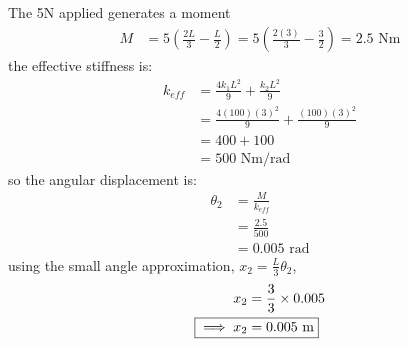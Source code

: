 \subsection{}
The 5N applied generates a moment 
\begin {align*}
    M &= 5 \left(\frac{2L}{3} - \frac{L}{2}\right)  = 5 \left(\frac{2 (3)}{3} - \frac{3}{2}\right) = 2.5 \text{ Nm}
\end{align*}
the effective stiffness is:
\begin{align*}
    k_{eff} &= \frac{4 k_1 L^2}{9} + \frac{k_2 L^2}{9} \\
    &= \frac{4 (100) (3)^2}{9} + \frac{(100) (3)^2}{9} \\
    &= 400 + 100 \\
    &= 500 \text{ Nm/rad}
\end{align*}
so the angular displacement is:
\begin{align*}
    \theta_2 &= \frac{M}{k_{eff}} \\
    &= \frac{2.5}{500} \\
    &= 0.005 \text{ rad}
\end{align*}
using the small angle approximation, $x_2 = \frac{L}{3} \theta_2$,
\begin{align*}
    x_2 &= \frac{3}{3} \times 0.005 \\
    \Aboxed{\implies x_2 &= 0.005 \text{ m}}
\end{align*}

